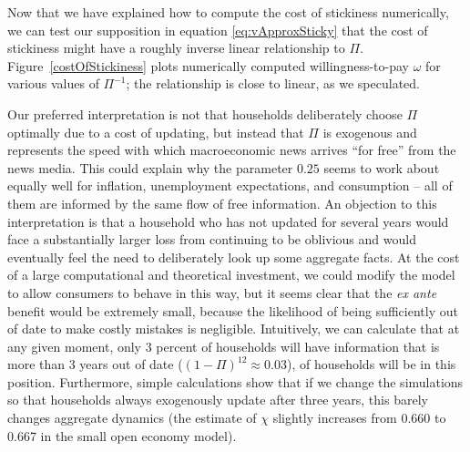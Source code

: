 \documentclass[titlepage]{\econtex}
\begin{document}
Now that we have explained how to compute the cost of stickiness numerically, we can test our supposition in equation \eqref{eq:vApproxSticky} that the cost of stickiness might have a roughly inverse linear relationship to $\Pi$.  Figure~\ref{costOfStickiness} plots numerically computed willingness-to-pay $\omega$ for various values of $\Pi^{-1}$; the relationship is close to linear, as we speculated.

Our preferred interpretation is not that households deliberately choose $\Pi$ optimally due to a cost of updating, but instead that $\Pi$ is exogenous and represents the speed with which macroeconomic news arrives ``for free'' from the news media.  This could explain why the parameter $0.25$ seems to work about equally well for inflation, unemployment expectations, and consumption -- all of them are informed by the same flow of free information. An objection to this interpretation is that a household who has not updated for several years would face a substantially larger loss from continuing to be oblivious and would eventually feel the need to deliberately look up some aggregate facts.  At the cost of a large computational and theoretical investment, we could modify the model to allow consumers to behave in this way, but it seems clear that the {\it ex ante} benefit would be extremely small, because the likelihood of being sufficiently out of date to make costly mistakes is negligible.  Intuitively, we can calculate that at any given moment, only 3 percent of households will have information that is more than 3 years out of date ($(1-\Pi)^{12} \approx 0.03$), of households will be in this position.  Furthermore, simple calculations show that if we change the simulations so that households always exogenously update after three years, this barely changes aggregate dynamics (the estimate of $\chi$ slightly increases from 0.660 to 0.667 in the small open economy model).
\end{document}
